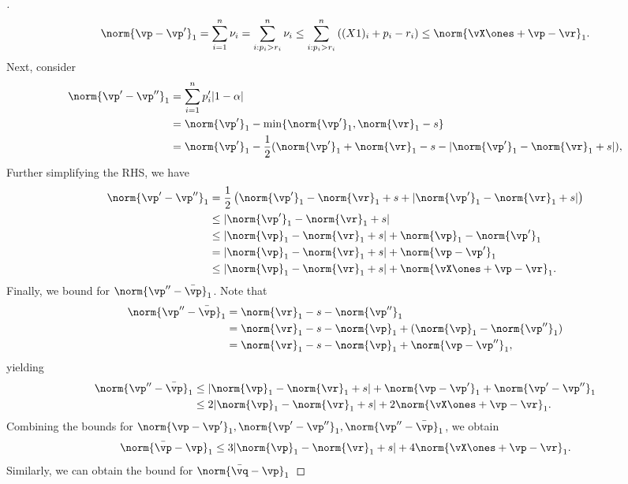 \begin{proof}[\unskip \nopunct]
\begin{align*}
    \norm{\vp - \vp'}_1 = \sum_{i=1}^n \nu_i = \sum_{i: p_i > r_i}^n \nu_i \leq \sum_{i: p_i > r_i}^n \left((X1)_i + p_i - r_i\right) \leq \norm{\vX \ones + \vp - \vr}_ 1.
\end{align*}
Next, consider 
\begin{align*}
    \norm{\vp' - \vp''}_1 &= \sum_{i=1}^n p'_i | 1- \alpha | \\
    &= \norm{\vp'}_1 - \min \{\norm{\vp'}_1,  \norm{\vr}_1 - s\} \\
    &= \norm{\vp'}_1 - \frac{1}{2}(\norm{\vp'}_1+ \norm{\vr}_1 - s - |\norm{\vp'}_1 - \norm{\vr}_1 + s|),
\end{align*}
Further simplifying the RHS, we have
\begin{align*}
    \norm{\vp' - \vp''}_1 &= \frac{1}{2} \left( \norm{\vp'}_1 - \norm{\vr}_1 + s + |\norm{\vp'}_1 - \norm{\vr}_1 + s| \right) \\
    &\leq |\norm{\vp'}_1 - \norm{\vr}_1 + s| \\
    &\leq |\norm{\vp}_1 - \norm{\vr}_1 + s| + \norm{\vp}_1 - \norm{\vp'}_1 \\
    &= |\norm{\vp}_1 - \norm{\vr}_1 + s| + \norm{\vp - \vp'}_1 \\
    &\leq |\norm{\vp}_1 - \norm{\vr}_1 + s| + \norm{\vX \ones + \vp - \vr}_1.
\end{align*}
Finally, we bound for  $\norm{\vp'' - \bar{\vp}}_1$. Note that 
\begin{align*}
    \norm{\vp'' - \bar{\vp}}_1 &= \norm{\vr}_1 - s - \norm{\vp''}_1  \\
    &= \norm{\vr}_1 - s - \norm{\vp}_1 + (\norm{\vp}_1 - \norm{\vp''}_1) \\
    &= \norm{\vr}_1 - s - \norm{\vp}_1 + \norm{\vp - \vp''}_1,
\end{align*}
yielding
\begin{align*}
    \norm{\vp'' - \bar{\vp}}_1 &\leq |\norm{\vp}_1 - \norm{\vr}_1 + s| + \norm{\vp - \vp'}_1 + \norm{\vp' - \vp''}_1 \\
    &\leq 2 |\norm{\vp}_1 - \norm{\vr}_1 + s| + 2 \norm{\vX \ones + \vp - \vr}_1.
\end{align*}
Combining the bounds for $\norm{\vp - \vp'}_1, \norm{\vp' - \vp''}_1, \norm{\vp'' - \bar{\vp}}_1$, we obtain
\begin{align*}
    \norm{\bar{\vp} - \vp}_1 \leq 3 |\norm{\vp}_1 - \norm{\vr}_1 + s| + 4 \norm{\vX \ones + \vp - \vr}_1.
\end{align*}
Similarly, we can obtain the bound for $\norm{\bar{\vq} - \vp}_1$

\end{proof}
